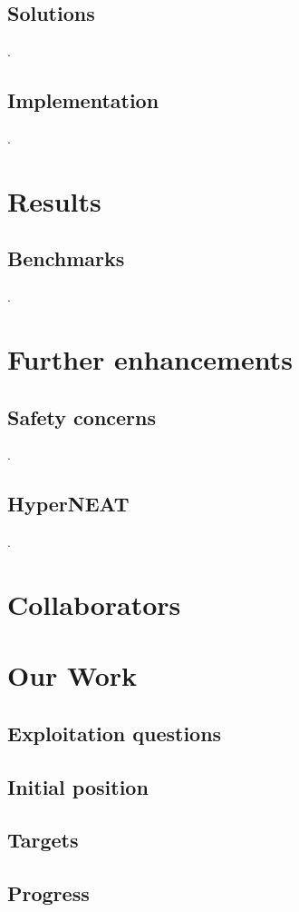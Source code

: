 \documentclass[11pt]{article}
\begin{document}
		\subsection{Solutions}
			.
		\subsection{Implementation}
			.
	\newpage

	\section{Results}
		\subsection{Benchmarks}
			.
	\newpage

	\section{Further enhancements}
		\subsection{Safety concerns}
			.
		\subsection{HyperNEAT}
			.
	\newpage

	\section{Collaborators}
		
	\newpage
	\section{Our Work}
		\subsection{Exploitation questions}
		\subsection{Initial position}
		\subsection{Targets}
		
		\subsection{Progress}
		

	\nocite{*}
	
	
\end{document}
